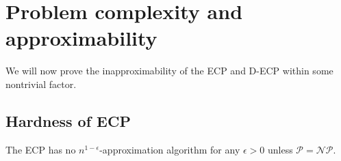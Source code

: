 \chapter{Problem complexity and approximability}%
\label{ch:complexity}

We will now prove the inapproximability of the \acrshort{ECP} and
\acrshort{D-ECP} within some nontrivial factor.

\section{Hardness of \acrshort{ECP}}%
\label{sub:ecp-hardness}

\begin{theorem}
	\label{th:approximability}
	The \acrfull{ECP} has no $n^{1-\epsilon} $-approximation algorithm for
	any $\epsilon > 0$ unless $\mathcal{P} = \mathcal{NP}  $.
\end{theorem}

